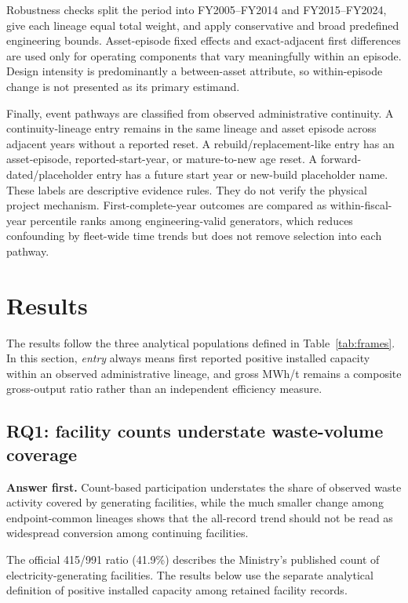 \documentclass[12pt,a4paper]{article}
\begin{document}
Robustness checks split the period into FY2005--FY2014 and FY2015--FY2024, give
each lineage equal total weight, and apply conservative and broad predefined
engineering bounds. Asset-episode fixed effects and exact-adjacent first
differences are used only for operating components that vary meaningfully
within an episode. Design intensity is predominantly a between-asset attribute,
so within-episode change is not presented as its primary estimand.

Finally, event pathways are classified from observed administrative continuity.
A continuity-lineage entry remains in the same lineage and asset episode across
adjacent years without a reported reset. A rebuild/replacement-like entry has an
asset-episode, reported-start-year, or mature-to-new age reset. A
forward-dated/placeholder entry has a future start year or new-build placeholder
name. These labels are descriptive evidence rules. They do not verify the
physical project mechanism. First-complete-year outcomes are compared as
within-fiscal-year percentile ranks among engineering-valid generators, which
reduces confounding by fleet-wide time trends but does not remove selection into
each pathway.

\section{Results}

The results follow the three analytical populations defined in
Table~\ref{tab:frames}. In this section, \emph{entry} always means first reported
positive installed capacity within an observed administrative lineage, and
gross MWh/t remains a composite gross-output ratio rather than an independent
efficiency measure.

\subsection{RQ1: facility counts understate waste-volume coverage}

\noindent\textbf{Answer first.} Count-based participation understates the share
of observed waste activity covered by generating facilities, while the much
smaller change among endpoint-common lineages shows that the all-record trend
should not be read as widespread conversion among continuing facilities.

The official 415/991 ratio (41.9\%) describes the Ministry's published count of
electricity-generating facilities. The results below use the separate analytical
definition of positive installed capacity among retained facility records.
\end{document}
